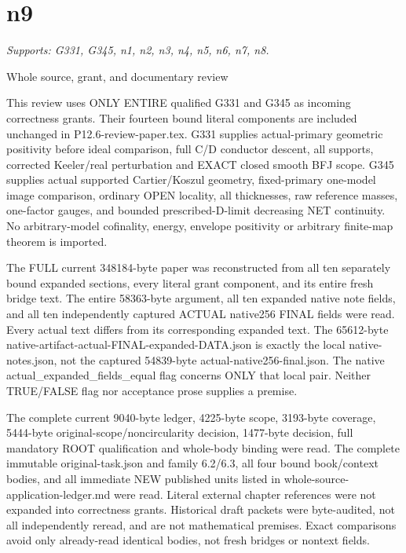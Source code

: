 \documentclass[11pt]{article}
\begin{document}
\section{n9}
\textit{Supports: G331, G345, n1, n2, n3, n4, n5, n6, n7, n8.}
\begin{ReviewBody}
Whole source, grant, and documentary review

This review uses ONLY ENTIRE qualified G331 and G345 as incoming correctness grants. Their fourteen bound literal components are included unchanged in P12.6-review-paper.tex. G331 supplies actual-primary geometric positivity before ideal comparison, full C/D conductor descent, all supports, corrected Keeler/real perturbation and EXACT closed smooth BFJ scope. G345 supplies actual supported Cartier/Koszul geometry, fixed-primary one-model image comparison, ordinary OPEN locality, all thicknesses, raw reference masses, one-factor gauges, and bounded prescribed-D-limit decreasing NET continuity. No arbitrary-model cofinality, energy, envelope positivity or arbitrary finite-map theorem is imported.

The FULL current 348184-byte paper was reconstructed from all ten separately bound expanded sections, every literal grant component, and its entire fresh bridge text. The entire 58363-byte argument, all ten expanded native note fields, and all ten independently captured ACTUAL native256 FINAL fields were read. Every actual text differs from its corresponding expanded text. The 65612-byte native-artifact-actual-FINAL-expanded-DATA.json is exactly the local native-notes.json, not the captured 54839-byte actual-native256-final.json. The native actual_expanded_fields_equal flag concerns ONLY that local pair. Neither TRUE/FALSE flag nor acceptance prose supplies a premise.

The complete current 9040-byte ledger, 4225-byte scope, 3193-byte coverage, 5444-byte original-scope/noncircularity decision, 1477-byte decision, full mandatory ROOT qualification and whole-body binding were read. The complete immutable original-task.json and family 6.2/6.3, all four bound book/context bodies, and all immediate NEW published units listed in whole-source-application-ledger.md were read. Literal external chapter references were not expanded into correctness grants. Historical draft packets were byte-audited, not all independently reread, and are not mathematical premises. Exact comparisons avoid only already-read identical bodies, not fresh bridges or nontext fields.


\end{ReviewBody}
\end{document}
